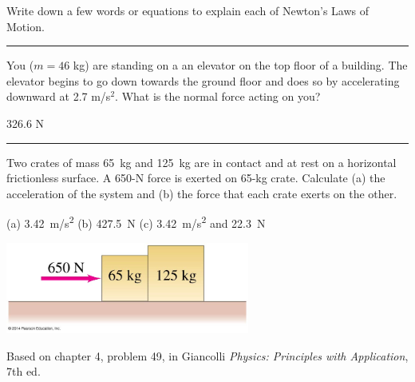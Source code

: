 \documentclass[12pt]{exam}
\begin{document}
\begin{questions}

\Large

\question Write down a few words or equations to explain each of Newton's Laws of Motion.

\vs \hrule \vs

\question You ($m=46$ kg) are standing on a an elevator on the top floor of a building.  The elevator begins to go down towards the ground floor and does so by accelerating downward at 2.7 m/s$^2$.  What is the normal force acting on you?

\begin{solution}[\stretch{1}]
  326.6 N 
\end{solution}

\hrule \vs

\question Two crates of mass 65~kg and 125~kg are in contact and at rest on a horizontal frictionless surface.  A 650-N force is exerted on 65-kg crate.  Calculate (a) the acceleration of the system and (b) the force that each crate exerts on the other.

\begin{solution}[\stretch{1}]
  (a) \SI{3.42}{m/s^2} (b) \SI{427.5}{N} (c) \SI{3.42}{m/s^2} and \SI{22.3}{N} 
\end{solution}


\includegraphics[height=3cm]{OpenStaxImages/Giancolli4-57.jpg}

\vspace{1em}

{\small Based on chapter 4, problem 49, in Giancolli \emph{Physics: Principles with Application}, 7th ed. }



\end{questions}
\end{document}
